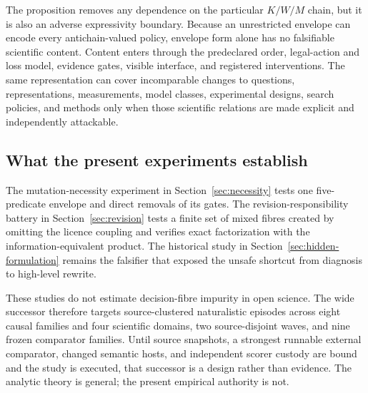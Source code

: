 The proposition removes any dependence on the particular $K/W/M$ chain, but
it is also an adverse expressivity boundary. Because an unrestricted envelope
can encode every antichain-valued policy, envelope form alone has no
falsifiable scientific content. Content enters through the predeclared order,
legal-action and loss model, evidence gates, visible interface, and registered
interventions. The same representation can cover incomparable changes to
questions, representations, measurements, model classes, experimental
designs, search policies, and methods only when those scientific relations are
made explicit and independently attackable.

\subsection{What the present experiments establish}

The mutation-necessity experiment in Section~\ref{sec:necessity} tests one
five-predicate envelope and direct removals of its gates. The
revision-responsibility battery in Section~\ref{sec:revision} tests a finite set
of mixed fibres created by omitting the licence coupling and verifies exact
factorization with the information-equivalent product. The historical study
in Section~\ref{sec:hidden-formulation} remains the falsifier that exposed the
unsafe shortcut from diagnosis to high-level rewrite.

These studies do not estimate decision-fibre impurity in open science. The
wide successor therefore targets source-clustered naturalistic episodes across
eight causal families and four scientific domains, two source-disjoint waves,
and nine frozen comparator families. Until source snapshots, a strongest
runnable external comparator, changed semantic hosts, and independent scorer
custody are bound and the study is executed, that successor is a design rather
than evidence. The analytic theory is general; the present empirical authority
is not.
